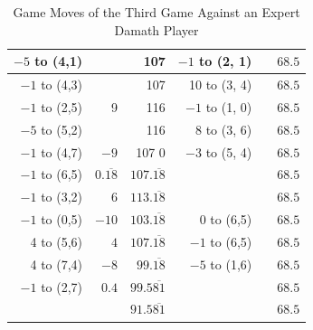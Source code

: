 \begin{appendices}
\begin{table}[H]
\begin{tabular}{rrrrrr}
         $-5$ to (4,1) &      &  107    &   $-1$ to (2, 1) &      &  $68.5$    \\ \hline
         $-1$ to (4,3) &      &  107    &   10 to (3, 4) &      &  $68.5$    \\ \hline
         $-1$ to (2,5) &  9    &  116    &   $-1$ to (1, 0) &      &  $68.5$    \\ \hline
         $-5$ to (5,2) &      &  116    &   8 to (3, 6) &      &  $68.5$    \\ \hline
         $-1$ to (4,7) &  $-9$  & 107  0    &   $-3$ to (5, 4) &      &  $68.5$    \\ \hline
         $-1$ to (6,5) &  $0.\overline{18}$    & $107.\overline{18}$     &                &      &  $68.5$    \\ \hline
         $-1$ to (3,2) &  6    &  $113.\overline{18}$    &                &      &  $68.5$    \\ \hline
         $-1$ to (0,5) &  $-10$    &  $103.\overline{18}$    &   0 to (6,5)   &      &  $68.5$    \\ \hline
          4 to (5,6) &  $4$    &  $107.\overline{18}$    &   $-1$ to (6,5)   &      &  $68.5$    \\ \hline
          4 to (7,4) &  $-8$    &  $99.\overline{18}$   &   $-5$ to (1,6)   &      &  $68.5$    \\ \hline
        $-1$ to (2,7) &  $0.4$    & $99.5\overline{81}$     &                &      &  $68.5$    \\ \hline \hline
           &      & $91.5\overline{81}$     &                &      &  $68.5$    \\ \hline
    \end{tabular}
    \caption{Game Moves of the Third Game Against an Expert Damath Player}
    \label{tab:third-game}
\end{table}


\end{appendices}
